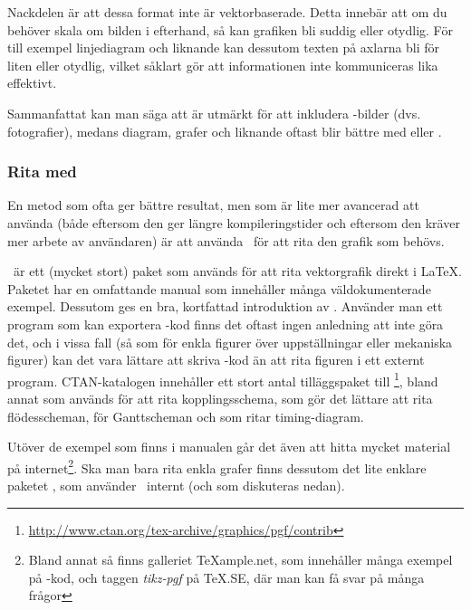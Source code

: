 \documentclass[lang=sv,ptsize=10pt,font=none,nomath,titles=bf,../../a4.tex]{subfiles}
\begin{document}
Nackdelen är att dessa format inte är vektorbaserade. Detta innebär att
om du behöver skala om bilden i efterhand, så kan grafiken bli suddig
eller otydlig. För till exempel linjediagram och liknande kan dessutom
texten på axlarna bli för liten eller otydlig, vilket såklart gör att
informationen inte kommuniceras lika effektivt. 

Sammanfattat kan man säga att  är utmärkt för att
inkludera \JPEG-bilder (dvs. fotografier), medans diagram, grafer och
liknande oftast blir bättre med \PGFTikZ eller .

\subsubsection{Rita med \PGFTikZ}
En metod som ofta ger bättre resultat, men som är lite mer avancerad att
använda (både eftersom den ger längre kompileringstider och eftersom den
kräver mer arbete av användaren) är att använda \PGFTikZ\ för att rita
den grafik som behövs.

\PGFTikZ\ är ett (mycket stort) paket som används för att rita
vektorgrafik direkt i \LaTeX. Paketet har en omfattande manual
\parencite{Tantau10} som innehåller många väldokumenterade exempel.
Dessutom ges en bra, kortfattad introduktion av \textcite{Mertz07}.
Använder man ett program som kan exportera \PGFTikZ-kod finns det oftast
ingen anledning att inte göra det, och i vissa fall (så som för enkla
figurer över uppställningar eller mekaniska figurer) kan det vara 
lättare att skriva \PGFTikZ-kod än att rita figuren i ett externt program.
CTAN-katalogen innehåller ett stort antal tilläggspaket till \PGFTikZ%
\footnote{\url{http://www.ctan.org/tex-archive/graphics/pgf/contrib}},
bland annat  \parencite{Redaelli12} som används
för att rita kopplingsschema,  \parencite{Robson13}
som gör det lättare att rita flödesscheman, 
\parencite{Skala13} för Ganttscheman och 
\parencite{Scharrer11} som ritar timing-diagram.

Utöver de exempel som finns i manualen går det även att hitta mycket
material på internet\footnote{Bland annat så finns galleriet
\TeX{}ample.net, som innehåller 
många exempel på \PGFTikZ-kod, och taggen \emph{tikz-pgf} på
\TeX.SE, 
där man kan få svar på många frågor}. Ska man bara rita enkla grafer
finns dessutom det lite enklare paketet , som använder
\PGFTikZ\ internt (och som diskuteras nedan).%
%
\end{document}
